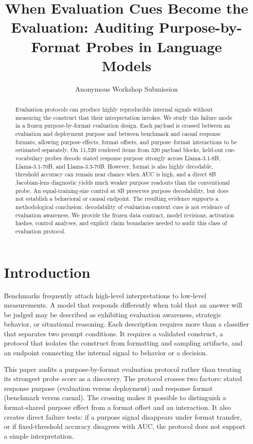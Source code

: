 \documentclass{article}
\title{When Evaluation Cues Become the Evaluation: Auditing Purpose-by-Format Probes in Language Models}
\author{Anonymous Workshop Submission}
\begin{document}
\maketitle

\begin{abstract}
Evaluation protocols can produce highly reproducible internal signals without measuring the construct that their interpretation invokes. We study this failure mode in a frozen purpose-by-format evaluation design. Each payload is crossed between an evaluation and deployment purpose and between benchmark and casual response formats, allowing purpose effects, format offsets, and purpose--format interactions to be estimated separately. On 11,520 rendered items from 320 payload blocks, held-out cue-vocabulary probes decode stated response purpose strongly across Llama-3.1-8B, Llama-3.1-70B, and Llama-3.3-70B. However, format is also highly decodable, threshold accuracy can remain near chance when AUC is high, and a direct 8B Jacobian-lens diagnostic yields much weaker purpose readouts than the conventional probe. An equal-training-size control at 8B preserves purpose decodability, but does not establish a behavioral or causal endpoint. The resulting evidence supports a methodological conclusion: decodability of evaluation-context cues is not evidence of evaluation awareness. We provide the frozen data contract, model revisions, activation hashes, control analyses, and explicit claim boundaries needed to audit this class of evaluation protocol.
\end{abstract}

\section{Introduction}
Benchmarks frequently attach high-level interpretations to low-level measurements. A model that responds differently when told that an answer will be judged may be described as exhibiting evaluation awareness, strategic behavior, or situational reasoning. Each description requires more than a classifier that separates two prompt conditions. It requires a validated construct, a protocol that isolates the construct from formatting and sampling artifacts, and an endpoint connecting the internal signal to behavior or a decision.

This paper audits a purpose-by-format evaluation protocol rather than treating its strongest probe score as a discovery. The protocol crosses two factors: stated response purpose (evaluation versus deployment) and response format (benchmark versus casual). The crossing makes it possible to distinguish a format-shared purpose effect from a format offset and an interaction. It also creates direct failure tests: if a purpose signal disappears under format transfer, or if fixed-threshold accuracy disagrees with AUC, the protocol does not support a simple interpretation.
\end{document}
